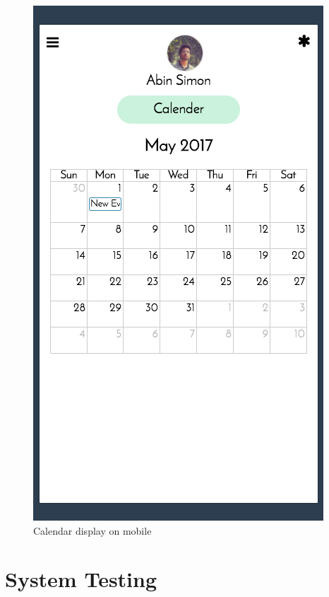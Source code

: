 \documentclass{article}
\begin{document}
\begin{figure}
  \includegraphics[width=\linewidth]{mobilecalendar.png}
  \caption{Calendar display on mobile}
\end{figure}


\newpage


\section{System Testing}
\vspace{1em}
\end{document}

